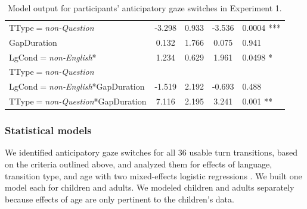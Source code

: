 \documentclass[authoryear, 12pt]{elsarticle}
\begin{document}
\begin{table}[h!]
\begin{small}
\begin{center}
\begin{tabular}{lcccl}
    TType$=$\textit{non-Question}							& -3.298   & 0.933 & -3.536 & 0.0004 ***	\\
    GapDuration														&  0.132   & 1.766 &  0.075 & 0.941			\\ 
    LgCond$=$\textit{non-English}*						&  1.234   & 0.629 &  1.961 & 0.0498 *		\\
    \hspace*{5mm} TType$=$\textit{non-Question} &&&& \\
    LgCond$=$\textit{non-English}*GapDuration		& -1.519   & 2.192 & -0.693 & 0.488			\\
    TType$=$\textit{non-Question}*GapDuration			&  7.116   & 2.195 &  3.241 & 0.001 **		\\
    \hline
  \end{tabular}
\end{center}
  \end{small}
  \caption{Model output for participants' anticipatory gaze switches in Experiment 1.}
\label{tab:E1-models}
\end{table}

\subsubsection*{Statistical models}
\label{sec:models1}

We identified anticipatory gaze switches for all 36 usable turn transitions, based on the criteria outlined above, and analyzed them for effects of language, transition type, and age with two mixed-effects logistic regressions \citep{lme4, R}. We built one model each for children and adults. We modeled children and adults separately because effects of age are only pertinent to the children's data.
\end{document}
